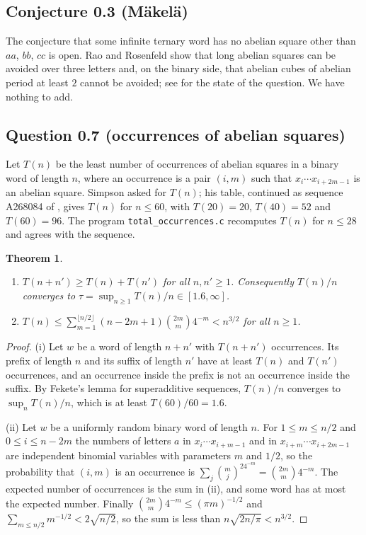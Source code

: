 \documentclass[11pt,reqno]{amsart}
\newtheorem{theorem}{Theorem}[section]
\theoremstyle{definition}
\newcommand{\fl}[1]{\lfloor #1\rfloor}
\begin{document}
\subsection{Conjecture 0.3 (M\"akel\"a)}
The conjecture that some infinite ternary word has no abelian square other than $aa$, $bb$, $cc$ is open. Rao and Rosenfeld \cite{RR15} show that long abelian squares can be avoided over three letters and, on the binary side, that abelian cubes of abelian period at least $2$ cannot be avoided; see \cite{FP23} for the state of the question. We have nothing to add.

\subsection{Question 0.7 (occurrences of abelian squares)}\label{ssec:occ}
Let $T(n)$ be the least number of occurrences of abelian squares in a binary word of length $n$, where an occurrence is a pair $(i,m)$ such that $x_i\cdots x_{i+2m-1}$ is an abelian square. Simpson asked for $T(n)$; his table, continued as sequence A268084 of \cite{OEIS}, gives $T(n)$ for $n\le 60$, with $T(20)=20$, $T(40)=52$ and $T(60)=96$. The program \texttt{total\_occurrences.c} recomputes $T(n)$ for $n\le 28$ and agrees with the sequence.

\begin{theorem}\label{thm:occ}
\begin{enumerate}
\item[(i)] $T(n+n')\ge T(n)+T(n')$ for all $n,n'\ge 1$. Consequently $T(n)/n$ converges to $\tau=\sup_{n\ge 1}T(n)/n\in[1.6,\infty]$.
\item[(ii)] $T(n)\le\sum_{m=1}^{\fl{n/2}}(n-2m+1)\binom{2m}{m}4^{-m}<n^{3/2}$ for all $n\ge 1$.
\end{enumerate}
\end{theorem}

\begin{proof}
(i) Let $w$ be a word of length $n+n'$ with $T(n+n')$ occurrences. Its prefix of length $n$ and its suffix of length $n'$ have at least $T(n)$ and $T(n')$ occurrences, and an occurrence inside the prefix is not an occurrence inside the suffix. By Fekete's lemma for superadditive sequences, $T(n)/n$ converges to $\sup_n T(n)/n$, which is at least $T(60)/60=1.6$.

(ii) Let $w$ be a uniformly random binary word of length $n$. For $1\le m\le n/2$ and $0\le i\le n-2m$ the numbers of letters $a$ in $x_i\cdots x_{i+m-1}$ and in $x_{i+m}\cdots x_{i+2m-1}$ are independent binomial variables with parameters $m$ and $1/2$, so the probability that $(i,m)$ is an occurrence is $\sum_j\binom{m}{j}^24^{-m}=\binom{2m}{m}4^{-m}$. The expected number of occurrences is the sum in (ii), and some word has at most the expected number. Finally $\binom{2m}{m}4^{-m}\le(\pi m)^{-1/2}$ and $\sum_{m\le n/2}m^{-1/2}<2\sqrt{n/2}$, so the sum is less than $n\sqrt{2n/\pi}<n^{3/2}$.
\end{proof}
\end{document}
